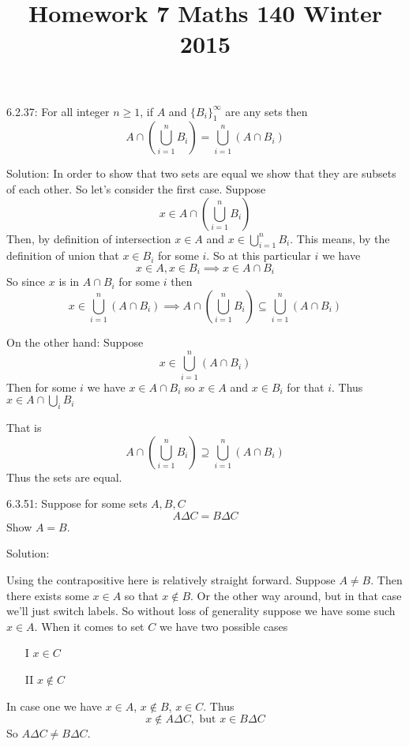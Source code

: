\documentclass[16 pt]{amsart}
\theoremstyle{definition}
\theoremstyle{remark}
\numberwithin{equation}{subsection}
\begin{document}
\title{Homework 7 Maths 140 Winter 2015}
\maketitle 

6.2.37: For all integer $n\ge 1$, if $A$ and $\{B_i\}_1^{\infty}$ are any sets then
\[
A\cap \left(\bigcup_{i=1}^{n} B_i\right) = \bigcup_{i=1}^{n}(A\cap B_i)
\]

\vspace{1in}

Solution: In order to show that two sets are equal we show that they are subsets of each other.  So let's consider the first case.  Suppose
\[
x\in A\cap \left(\bigcup_{i=1}^{n} B_i\right)
\]
Then, by definition of intersection $x\in A$ and $x\in \bigcup_{i=1}^{n} B_i$.  This means, by the definition of union that $x\in B_i$ for some $i$.  So at this particular $i$ we have 
\[
x\in A, x\in B_i \implies x\in A\cap B_i
\]
So since $x$ is in $A\cap B_i$ for some $i$ then
\[
x\in \bigcup_{i=1}^{n}(A\cap B_i) \implies A\cap \left(\bigcup_{i=1}^{n} B_i\right) \subseteq \bigcup_{i=1}^{n}(A\cap B_i)
\]

On the other hand: Suppose
\[
x \in \bigcup_{i=1}^{n} (A\cap B_i)
\]
Then for some $i$ we have $x\in A\cap B_i$ so $x\in A$ and $x\in B_i$ for that $i$.  Thus $x\in A \cap \bigcup_i B_i$

That is 
\[
A\cap \left(\bigcup_{i=1}^{n} B_i\right) \supseteq \bigcup_{i=1}^{n}(A\cap B_i)
\]
Thus the sets are equal.

\newpage

6.3.51: Suppose for some sets $A,B,C$ 
\[
A\Delta C = B\Delta C
\]
Show $A=B$.

\vspace{1in}

Solution:

Using the contrapositive here is relatively straight forward.
Suppose $A\neq B$.  Then there exists some $x\in A$ so that $x\notin B$.  Or the other way around, but in that case we'll just switch labels.  So without loss of generality suppose we have some such $x\in A$. When it comes to set $C$ we have two possible cases
\begin{itemize}
\item[I] $x\in C$\\
\item[II] $x\notin C$
\end{itemize}

In case one we have $x\in A$, $x\notin B$, $x\in C$.  Thus
\[
x\notin A\Delta C, \text{ but } x\in B\Delta C
\]
So $A\Delta C \neq B\Delta C$.
\end{document}
